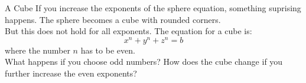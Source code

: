 \begin{surferPage}{A Cube}
If you increase the exponents of the sphere equation, something suprising happens. The sphere becomes a cube with rounded corners.\\
\vspace{0.3cm}
But this does not hold for all exponents. The equation for a cube is:
\[x^n+y^n+z^n=b\]
where the number $n$ has to be even.\\
\vspace{0.3cm}
What happens if you choose odd numbers? How does the cube change if you further increase the even exponents?
\end{surferPage}
